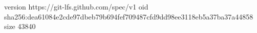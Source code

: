 version https://git-lfs.github.com/spec/v1
oid sha256:dea61084e2cde97dbeb79b694fef709487cfd9dd98ee3118eb5a37ba37a44858
size 43840
